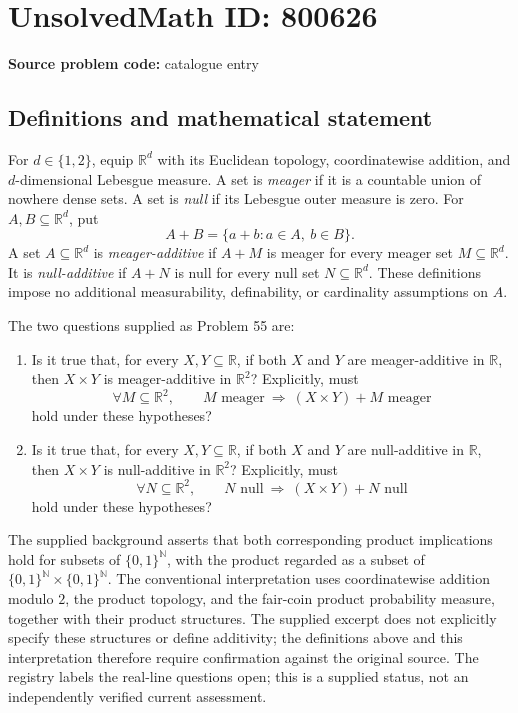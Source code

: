 \documentclass[11pt]{article}
\newcommand{\R}{\mathbb{R}}
\begin{document}
\section*{UnsolvedMath ID: 800626}
\textbf{Source problem code:} catalogue entry
\subsection{Definitions and mathematical statement}
For \(d\in\{1,2\}\), equip \(\R^d\) with its Euclidean topology, coordinatewise addition, and \(d\)-dimensional Lebesgue measure. A set is \emph{meager} if it is a countable union of nowhere dense sets. A set is \emph{null} if its Lebesgue outer measure is zero. For \(A,B\subseteq\R^d\), put
\[
A+B=\{a+b:a\in A,\ b\in B\}.
\]
A set \(A\subseteq\R^d\) is \emph{meager-additive} if \(A+M\) is meager for every meager set \(M\subseteq\R^d\). It is \emph{null-additive} if \(A+N\) is null for every null set \(N\subseteq\R^d\). These definitions impose no additional measurability, definability, or cardinality assumptions on \(A\).

The two questions supplied as Problem 55 are:
\begin{enumerate}
\item Is it true that, for every \(X,Y\subseteq\R\), if both \(X\) and \(Y\) are meager-additive in \(\R\), then \(X\times Y\) is meager-additive in \(\R^2\)? Explicitly, must
\[
\forall M\subseteq\R^2,\qquad
M\text{ meager}\ \Longrightarrow\ (X\times Y)+M\text{ meager}
\]
hold under these hypotheses?
\item Is it true that, for every \(X,Y\subseteq\R\), if both \(X\) and \(Y\) are null-additive in \(\R\), then \(X\times Y\) is null-additive in \(\R^2\)? Explicitly, must
\[
\forall N\subseteq\R^2,\qquad
N\text{ null}\ \Longrightarrow\ (X\times Y)+N\text{ null}
\]
hold under these hypotheses?
\end{enumerate}

The supplied background asserts that both corresponding product implications hold for subsets of \(\{0,1\}^{\mathbb N}\), with the product regarded as a subset of \(\{0,1\}^{\mathbb N}\times\{0,1\}^{\mathbb N}\). The conventional interpretation uses coordinatewise addition modulo \(2\), the product topology, and the fair-coin product probability measure, together with their product structures. The supplied excerpt does not explicitly specify these structures or define additivity; the definitions above and this interpretation therefore require confirmation against the original source. The registry labels the real-line questions open; this is a supplied status, not an independently verified current assessment.
\end{document}
